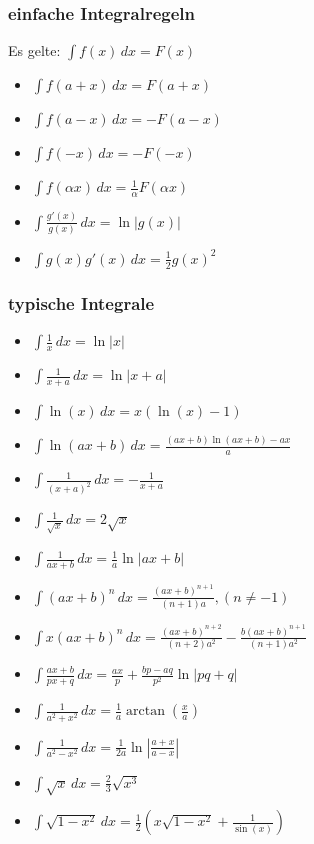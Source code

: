 \subsubsection{einfache Integralregeln}
Es gelte: $\int f(x) \, dx = F(x)$
\begin{itemize}[leftmargin=*]
	\item $\int f(a + x) \,dx = F(a + x)$
	\item $\int f(a - x) \,dx = -F(a-x)$
	\item $\int f(-x) \,dx = -F(-x)$
	\item $\int f(\alpha x) \,dx = \frac{1}{\alpha}F(\alpha x)$
	\item $\int \frac{g'(x)}{g(x)} \, dx = \ln|g(x)|$
	\item $\int g(x)g'(x) \, dx = \frac{1}{2}g(x)^2$
\end{itemize}
\subsubsection{typische Integrale}
\begin{itemize}[leftmargin=*]
  	\item $\int \frac{1}{x} \,dx = \ln |x|$
  	\item $\int \frac{1}{x+a} \,dx = \ln |x+a|$
  	\item $\int \ln(x) \,dx = x(\ln(x) - 1)$
  	\item $\int \ln(ax + b) \,dx = \frac{(a x+b) \ln (a x+b)-a x}{a}$
  	\item $\int \frac{1}{(x+a)^2} \,dx = - \frac{1}{x+a}$
  	\item $\int \frac{1}{\sqrt{x}} \,dx = 2 \sqrt{x}$
	\item $\int \frac{1}{ax+b} \,dx = \frac{1}{a} \ln |ax+b|$
	\item $\int(ax + b)^n \,dx = \frac{(ax + b)^{n+1}}{(n + 1)a}, (n \neq -1)$
	\item $\int x(ax+b)^n \,dx = \frac{(ax + b)^{n+2}}{(n+2)a^2} -
	\frac{b(ax+b)^{n+1}}{(n+1)a^2}$
	\item $\int \frac{ax + b}{px + q} \,dx = \frac{ax}{p} + \frac{bp - aq}{p^2} \ln
	|pq+q|$
	\item $\int \frac{1}{a^2 + x^2} \,dx = \frac{1}{a} \arctan(\frac{x}{a})$
	\item $\int \frac{1}{a^2 - x^2} \,dx = \frac{1}{2a} \ln \left | \frac{a+x}{a-x}
	\right |$
	\item $\int \sqrt{x} \,dx = \frac{2}{3}\sqrt{x^3}$
	\item $\int \sqrt{1-x^2} \,dx = \frac{1}{2}\left( x\sqrt{1-x^2}+\frac{1}{\sin(x)} \right)$
\end{itemize}

